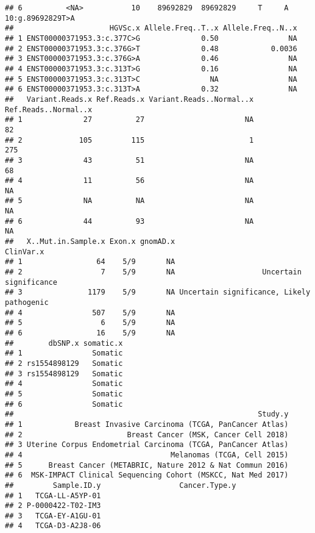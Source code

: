 \documentclass[
]{article}
\begin{document}
\begin{verbatim}
## 6          <NA>           10    89692829  89692829     T     A 10:g.89692829T>A
##                      HGVSc.x Allele.Freq..T..x Allele.Freq..N..x
## 1 ENST00000371953.3:c.377C>G              0.50                NA
## 2 ENST00000371953.3:c.376G>T              0.48            0.0036
## 3 ENST00000371953.3:c.376G>A              0.46                NA
## 4 ENST00000371953.3:c.313T>G              0.16                NA
## 5 ENST00000371953.3:c.313T>C                NA                NA
## 6 ENST00000371953.3:c.313T>A              0.32                NA
##   Variant.Reads.x Ref.Reads.x Variant.Reads..Normal..x Ref.Reads..Normal..x
## 1              27          27                       NA                   82
## 2             105         115                        1                  275
## 3              43          51                       NA                   68
## 4              11          56                       NA                   NA
## 5              NA          NA                       NA                   NA
## 6              44          93                       NA                   NA
##   X..Mut.in.Sample.x Exon.x gnomAD.x                                 ClinVar.x
## 1                 64    5/9       NA                                          
## 2                  7    5/9       NA                    Uncertain significance
## 3               1179    5/9       NA Uncertain significance, Likely pathogenic
## 4                507    5/9       NA                                          
## 5                  6    5/9       NA                                          
## 6                 16    5/9       NA                                          
##        dbSNP.x somatic.x
## 1                Somatic
## 2 rs1554898129   Somatic
## 3 rs1554898129   Somatic
## 4                Somatic
## 5                Somatic
## 6                Somatic
##                                                        Study.y
## 1            Breast Invasive Carcinoma (TCGA, PanCancer Atlas)
## 2                        Breast Cancer (MSK, Cancer Cell 2018)
## 3 Uterine Corpus Endometrial Carcinoma (TCGA, PanCancer Atlas)
## 4                                  Melanomas (TCGA, Cell 2015)
## 5      Breast Cancer (METABRIC, Nature 2012 & Nat Commun 2016)
## 6  MSK-IMPACT Clinical Sequencing Cohort (MSKCC, Nat Med 2017)
##         Sample.ID.y                  Cancer.Type.y
## 1   TCGA-LL-A5YP-01                               
## 2 P-0000422-T02-IM3                               
## 3   TCGA-EY-A1GU-01                               
## 4   TCGA-D3-A2J8-06                               

\end{verbatim}
\end{document}
